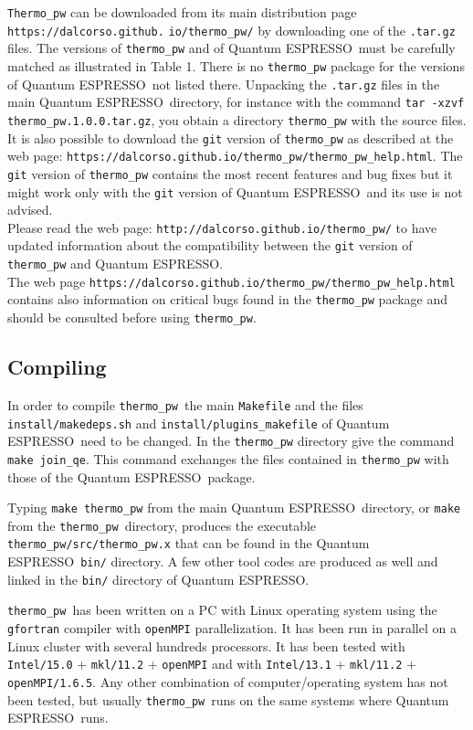 \documentclass[12pt,a4paper]{article}
\def\qe{{\sc Quantum ESPRESSO}}
\def\thermo{\texttt{thermo\_pw}}
\begin{document}
\texttt{Thermo\_pw} can be downloaded from its main distribution page
\texttt{https://dalcorso.github.} \texttt{io/thermo\_pw/}
by downloading one of the \texttt{.tar.gz} files.
The versions of \texttt{thermo\_pw} and of \qe\ must be carefully matched
as illustrated in Table 1. 
There is no \texttt{thermo\_pw} package for the versions of \qe\ not listed 
there. Unpacking the \texttt{.tar.gz} files in the main \qe\ directory, for
instance with the command \texttt{tar -xzvf thermo\_pw.1.0.0.tar.gz}, you
obtain a directory \texttt{thermo\_pw} with the source files. \\
It is also possible to download the \texttt{git} version of 
\texttt{thermo\_pw} as described at
the web page: 
\texttt{https://dalcorso.github.io/thermo\_pw/thermo\_pw\_help.html}.
The \texttt{git} version of \texttt{thermo\_pw} contains the most recent
features and bug fixes but it might work only with the \texttt{git} 
version of \qe\ and its use is not advised. \\
Please read the web page: 
\texttt{http://dalcorso.github.io/thermo\_pw/} 
to have updated information about the compatibility between the \texttt{git} 
version of \texttt{thermo\_pw} and \qe. \\
The web page \texttt{https://dalcorso.github.io/thermo\_pw/thermo\_pw\_help.html}
contains also information on critical bugs found in the 
\texttt{thermo\_pw} package and should be consulted before using 
\texttt{thermo\_pw}.

\subsection{\color{web-blue}Compiling}

In order to compile \thermo\ the main \texttt{Makefile} and the files
\texttt{install/makedeps.sh} and \texttt{install/plugins\_makefile}
of \qe\ need to be changed. In the \texttt{thermo\_pw}
directory give the command \texttt{make join\_qe}. This command exchanges
the files contained in \texttt{thermo\_pw} with those of the \qe\ package.

Typing \texttt{make thermo\_pw} from the main \qe\ directory, or \texttt{make} 
from the \texttt{thermo\_pw}\ directory, produces the executable
\texttt{thermo\_pw/src/thermo\_pw.x} that can be found in the 
\qe\ \texttt{bin/} directory. A few other tool codes are produced as well
and linked in the \texttt{bin/} directory of \qe.

\thermo\ has been written on a PC with Linux operating system using the
\texttt{gfortran} compiler with \texttt{openMPI} parallelization. It has
been run in parallel on a Linux cluster with several hundreds processors.
It has been tested with \texttt{Intel/15.0} + \texttt{mkl/11.2} +
\texttt{openMPI} and with \texttt{Intel/13.1} + \texttt{mkl/11.2} +
\texttt{openMPI/1.6.5}.
Any other combination of computer/operating system has not been tested, but 
usually \thermo\ runs on the same systems where \qe\ runs. 
\end{document}
